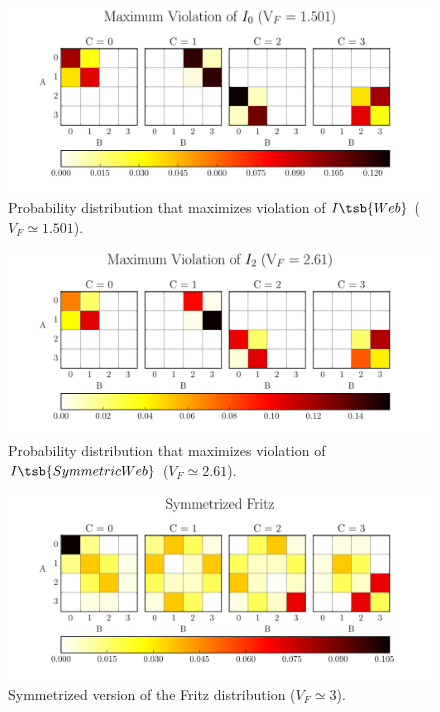 \documentclass[aps, 10pt, english, twoside, pra, nofootinbib, tightenlines, longbibliography, superscriptaddress]{revtex4-1}
\begin{document}
    \begin{figure}
    \begin{nscenter}
            \includegraphics[scale=0.6,trim={0 0 0 0.4in},clip]{../../figures/distributions/plotted_dist_I_1_max_violation_2017.pdf}
            \caption{Probability distribution that maximizes violation of $I\tsb{Web}$ ($V_F \simeq 1.501$).}
            \label{fig:maximum_violation_I_1}
    \end{nscenter}
    \end{figure}
    \begin{figure}
    \begin{nscenter}
            \includegraphics[scale=0.6,trim={0 0 0 0.4in},clip]{../../figures/distributions/plotted_dist_I_3_max_violation_2017.pdf}
            \caption{Probability distribution that maximizes violation of $I\tsb{SymmetricWeb}$ ($V_F \simeq 2.61$).}
            \label{fig:maximum_violation_I_3}
    \end{nscenter}
    \end{figure}
    \begin{figure}
    \begin{nscenter}
            \includegraphics[scale=0.6,trim={0 0 0 0.4in},clip]{../../figures/distributions/symmetrized_fritz.pdf}
            \caption{Symmetrized version of the Fritz distribution ($V_F \simeq 3$).}
            \label{fig:symmetrized_fritz}
    \end{nscenter}
    \end{figure}
\end{document}
